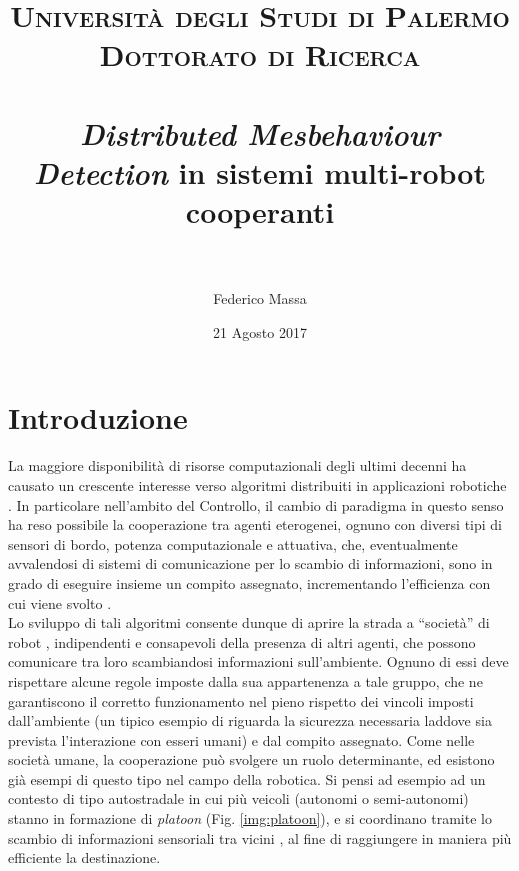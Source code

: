 \documentclass[paper=a4, fontsize=11pt]{scrartcl} %
\title{	
\normalfont \normalsize 
\textsc{Università degli Studi di Palermo}\\
\textsc{Dottorato di Ricerca}\\[25pt] %
\horrule{0.5pt} \\[0.4cm] %
\huge \textit{Distributed Mesbehaviour Detection} in sistemi multi-robot cooperanti\\ %
\horrule{2pt} \\[0.5cm] %
}
\author{Federico Massa} %
\date{\normalsize 21 Agosto 2017} %
\numberwithin{equation}{section} %
\numberwithin{table}{section} %
\begin{document}

\maketitle %


\section{Introduzione}

La maggiore disponibilità di risorse computazionali degli ultimi decenni ha causato un crescente interesse verso algoritmi distribuiti in applicazioni robotiche \cite{Lynch-book}. In particolare nell'ambito del Controllo, il cambio di paradigma in questo senso ha reso possibile la cooperazione tra agenti eterogenei, ognuno con
diversi tipi di sensori di bordo, potenza computazionale e attuativa, che, eventualmente avvalendosi di sistemi di comunicazione per lo scambio di informazioni, sono in grado di eseguire insieme un compito assegnato,
incrementando l'efficienza con cui viene svolto \cite{coordination1}. \\

Lo sviluppo di tali algoritmi consente dunque di aprire la strada a ``società'' di robot    \cite{ram10-bfp}, indipendenti e consapevoli della presenza di altri agenti, che possono comunicare tra loro scambiandosi
informazioni sull'ambiente. 
Ognuno di essi deve rispettare alcune regole
imposte dalla sua appartenenza a tale gruppo, che ne garantiscono il corretto funzionamento nel pieno rispetto dei vincoli imposti dall'ambiente
(un tipico esempio di riguarda la sicurezza necessaria laddove 
sia prevista l'interazione con esseri umani) e dal compito assegnato. 
Come nelle società umane, la cooperazione
può svolgere un ruolo determinante, ed esistono già esempi di questo
tipo nel campo della robotica. Si pensi ad esempio ad un contesto di tipo autostradale in cui 
più veicoli (autonomi o semi-autonomi) stanno in formazione di \textit{platoon} (Fig. \ref{img:platoon}), e si coordinano tramite lo scambio di informazioni sensoriali tra vicini \cite{platoon1}, al 
fine di raggiungere in maniera più efficiente la destinazione. \\
\end{document}
